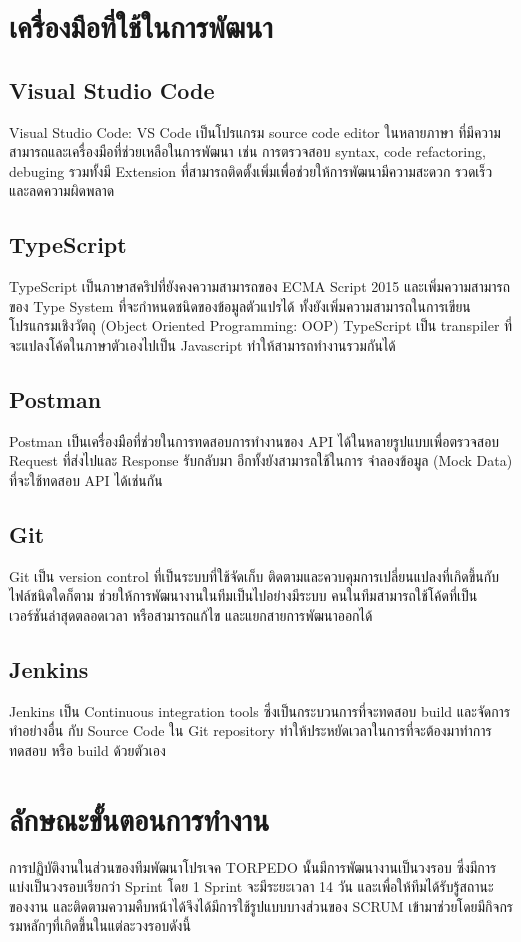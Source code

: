 \section{เครื่องมือที่ใช้ในการพัฒนา}

\subsection{Visual Studio Code}
Visual Studio Code: VS Code เป็นโปรแกรม source code editor ในหลายภาษา ที่มีความสามารถและเครื่องมือที่ช่วยเหลือในการพัฒนา เช่น การตรวจสอบ syntax, code refactoring, debuging รวมทั้งมี Extension ที่สามารถติดตั้งเพิ่มเพื่อช่วยให้การพัฒนามีความสะดวก รวดเร็ว และลดความผิดพลาด
\subsection{TypeScript}
TypeScript เป็นภาษาสคริปที่ยังคงความสามารถของ ECMA Script 2015 และเพิ่มความสามารถของ Type System ที่จะกำหนดชนิดของข้อมูลตัวแปรได้ ทั้งยังเพิ่มความสามารถในการเขียนโปรแกรมเชิงวัตถุ (Object Oriented Programming: OOP) TypeScript เป็น transpiler ที่จะแปลงโค้ดในภาษาตัวเองไปเป็น Javascript ทำให้สามารถทำงานรวมกันได้
\subsection{Postman}
Postman เป็นเครื่องมือที่ช่วยในการทดสอบการทำงานของ API ได้ในหลายรูปแบบเพื่อตรวจสอบ Request ที่ส่งไปและ Response รับกลับมา อีกทั้งยังสามารถใช้ในการ จำลองข้อมูล (Mock Data)  ที่จะใช้ทดสอบ API ได้เช่นกัน
\subsection{Git}
Git เป็น version control ที่เป็นระบบที่ใช้จัดเก็บ ติดตามและควบคุมการเปลี่ยนแปลงที่เกิดขึ้นกับไฟล์ชนิดใดก็ตาม ช่วยให้การพัฒนางานในทีมเป็นไปอย่างมีระบบ คนในทีมสามารถใช้โค้ดที่เป็นเวอร์ชันล่าสุดตลอดเวลา หรือสามารถแก้ไข และแยกสายการพัฒนาออกได้
\subsection{Jenkins}
Jenkins เป็น Continuous integration tools ซึ่งเป็นกระบวนการที่จะทดสอบ build และจัดการทำอย่างอื่น กับ Source Code ใน Git repository ทำให้ประหยัดเวลาในการที่จะต้องมาทำการทดสอบ หรือ build ด้วยตัวเอง

\section{ลักษณะขั้นตอนการทำงาน}
การปฏิบัติงานในส่วนของทีมพัฒนาโปรเจค TORPEDO นั้นมีการพัฒนางานเป็นวงรอบ ซึ่งมีการแบ่งเป็นวงรอบเรียกว่า Sprint โดย 1 Sprint จะมีระยะเวลา 14 วัน และเพื่อให้ทีมได้รับรู้สถานะของงาน และติดตามความคืบหน้าได้จึงได้มีการใช้รูปแบบบางส่วนของ SCRUM  เข้ามาช่วยโดยมีกิจกรรมหลักๆที่เกิดขึ้นในแต่ละวงรอบดังนี้
